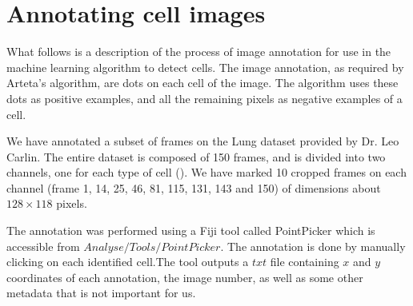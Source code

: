     
    \section{Annotating cell images }
    \label{sec:data_annotation}
    
    What follows is a description of the process of image annotation for use in the machine learning algorithm to detect cells. The image annotation, as required by Arteta's \cite{arteta12} algorithm, are dots on each cell of the image. The algorithm uses these dots as positive examples, and all the remaining pixels as negative examples of a cell.
    
    We have annotated a subset of frames on the Lung dataset provided by Dr. Leo Carlin. The entire dataset is composed of 150 frames, and is divided into two channels, one for each type of cell (). We have marked 10 cropped frames on each channel (frame 1, 14, 25, 46, 81, 115, 131, 143 and 150) of dimensions about $128\times118$ pixels.
    
    The annotation was performed using a Fiji \cite{fiji12} tool called PointPicker \cite{thevanez14} which is accessible from \(Analyse/Tools/PointPicker\). The annotation is done by manually clicking on each identified cell.The tool outputs a $txt$ file containing $x$ and $y$ coordinates of each annotation, the image number, as well as some other metadata that is not important for us.
    
